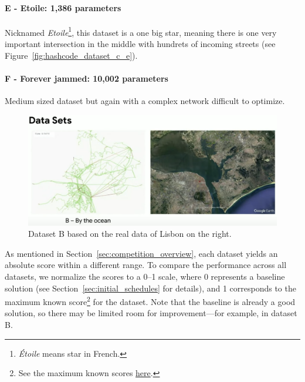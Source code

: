 \paragraph{E - Etoile: 1,386 parameters} Nicknamed \textit{Etoile}\footnote{\textit{Étoile} means star in French.}, this dataset is a one big star, meaning there is one very important intersection in the middle with hundrets of incoming streets (see Figure~\ref{fig:hashcode_dataset_c_e}).

\paragraph{F - Forever jammed: 10,002 parameters} Medium sized dataset but again with a complex network difficult to optimize.

\begin{figure}[h]
    \centering
    \includegraphics[width=\linewidth]{img/screenshots/hashcode_datasets_b.png}
    \caption[Visualization of dataset B]{
        Dataset B based on the real data of Lisbon on the right\footnotemark.
    }
    \label{fig:hashcode_dataset_b}
\end{figure}


\bigskip

As mentioned in Section~\ref{sec:competition_overview}, each dataset yields an absolute score within a different range. To compare the performance across all datasets, we normalize the scores to a 0--1 scale, where 0 represents a baseline solution (see Section~\ref{sec:initial_schedules} for details), and 1 corresponds to the maximum known score\footnote{See the maximum known scores \href{https://github.com/sagishporer/hashcode-2021-qualification\#score}{here}.} for the dataset. Note that the baseline is already a good solution, so there may be limited room for improvement---for example, in dataset B.

